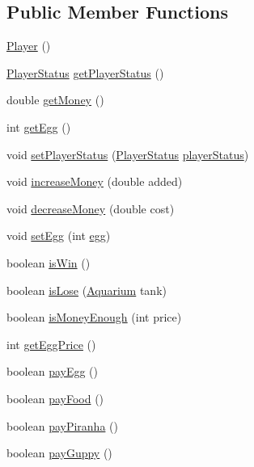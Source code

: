 \subsection*{Public Member Functions}
\begin{DoxyCompactItemize}
\item 
\mbox{\hyperlink{class_player_a712a726b07cf901c040116d6d0c5cc66}{Player}} ()
\item 
\mbox{\hyperlink{enum_player_1_1_player_status}{Player\+Status}} \mbox{\hyperlink{class_player_a0c7b0dad54f27eeccf3bb8e1bd4779c9}{get\+Player\+Status}} ()
\item 
double \mbox{\hyperlink{class_player_a92a543d59ea6cb11b01f424f8957f58c}{get\+Money}} ()
\item 
int \mbox{\hyperlink{class_player_a3845f8524497669aefc7a89c5e5f7e7f}{get\+Egg}} ()
\item 
void \mbox{\hyperlink{class_player_ac740d3458e2caf24efcdb95198c2a388}{set\+Player\+Status}} (\mbox{\hyperlink{enum_player_1_1_player_status}{Player\+Status}} \mbox{\hyperlink{class_player_a022b57fd4b98752acacbbc5d1ec35e45}{player\+Status}})
\item 
void \mbox{\hyperlink{class_player_a09d885315c59a404c418155e04fed379}{increase\+Money}} (double added)
\item 
void \mbox{\hyperlink{class_player_a32e700ea6b8d4792d24cd8a245c9706f}{decrease\+Money}} (double cost)
\item 
void \mbox{\hyperlink{class_player_ae89921d6eb811215711a62d7e6520a69}{set\+Egg}} (int \mbox{\hyperlink{class_player_a9ed64c22212ad7526eca0903a05f9967}{egg}})
\item 
boolean \mbox{\hyperlink{class_player_ad54876d910aca3a92ae90ded139953ec}{is\+Win}} ()
\item 
boolean \mbox{\hyperlink{class_player_a612fdd92f5c71a5dd8c3cd9ead192546}{is\+Lose}} (\mbox{\hyperlink{class_aquarium}{Aquarium}} tank)
\item 
boolean \mbox{\hyperlink{class_player_a5836d6213f249c1928423d9036ec9e4e}{is\+Money\+Enough}} (int price)
\item 
int \mbox{\hyperlink{class_player_a49009dfbdc77841a389ab9f9d84ff2e2}{get\+Egg\+Price}} ()
\item 
boolean \mbox{\hyperlink{class_player_a8854a672f539bc72f7f09b57d20e8467}{pay\+Egg}} ()
\item 
boolean \mbox{\hyperlink{class_player_a61e99d628085fda9765af1d27b5d6d8d}{pay\+Food}} ()
\item 
boolean \mbox{\hyperlink{class_player_aa46852c65ff869246dd5ae918e2b8683}{pay\+Piranha}} ()
\item 
boolean \mbox{\hyperlink{class_player_ae1169535a36bb44c7e37af0c7cf75410}{pay\+Guppy}} ()
\end{DoxyCompactItemize}
